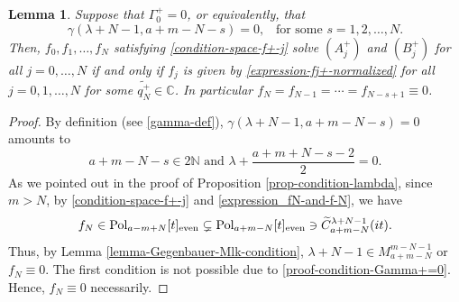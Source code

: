 \documentclass[12pt, pdflatex, a4paper]{article}
\theoremstyle{plain}
\newtheorem{lemma}[thm]{Lemma}
\theoremstyle{definition}
\def\C{{\mathbb C}}
\def\Geg{\widetilde{C}}
\def\N{{\mathbb N}}
\def\Pol{\text{\normalfont{Pol}}}
\begin{document}
\begin{lemma}\label{lemma-Gamma+zero}
Suppose that $\Gamma_0^+ = 0$, or equivalently, that
\begin{equation*}
\gamma(\lambda+N-1, a+m-N-s) = 0, \enspace \text{ for some } s = 1, 2, \ldots, N.
\end{equation*}
Then, $f_0, f_1, \ldots, f_N$ satisfying \eqref{condition-space-f+-j} solve $(A_j^+)$ and $(B_j^+)$ for all $j = 0, \ldots, N$ if and only if $f_{j}$ is given by \eqref{expression-fj+-normalized} for all $j = 0, 1, \ldots, N$ for some $\widetilde{q_N^+} \in \C$. In particular $f_N = f_{N-1} = \cdots = f_{N-s+1} \equiv 0$.
\end{lemma}
\begin{proof}
By definition (see \eqref{gamma-def}), $\gamma(\lambda+N-1, a+m-N-s) = 0$ amounts to
\begin{equation}\label{proof-condition-Gamma+=0}
a+m-N-s \in 2\N\text{ and } \lambda+\frac{a+m+N-s-2}{2}=0.
\end{equation}
As we pointed out in the proof of Proposition \ref{prop-condition-lambda}, since $m>N$, by \eqref{condition-space-f+-j} and \eqref{expression_fN-and-f-N}, we have
\begin{equation*}
f_N \in \Pol_{a-m+N}[t]_\text{even} \subsetneq \Pol_{a+m-N}[t]_\text{even} \ni \Geg_{a+m-N}^{\lambda+N-1}(it). 
\end{equation*}
Thus, by Lemma \ref{lemma-Gegenbauer-Mlk-condition}, $\lambda+N-1 \in M_{a+m-N}^{m-N-1}$ or $f_N \equiv 0$. The first condition is not possible due to \eqref{proof-condition-Gamma+=0}. Hence, $f_N \equiv 0$ necessarily.


\end{proof}
\end{document}
